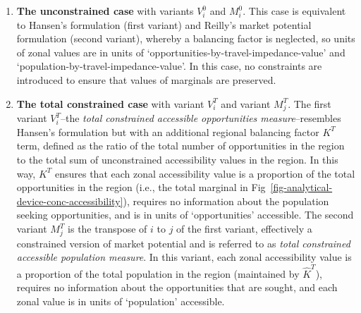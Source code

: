 \documentclass[
  10pt,
  letterpaper,
]{article}
\begin{document}
\begin{enumerate}
\def\labelenumi{\arabic{enumi}.}
\item
  \textbf{The unconstrained case} with variants \(V_i^0\) and \(M_i^0\).
  This case is equivalent to Hansen's \citep{hansen1959} formulation
  (first variant) and Reilly's \citep{reilly1929methods} market
  potential formulation (second variant), whereby a balancing factor is
  neglected, so units of zonal values are in units of
  `opportunities-by-travel-impedance-value' and
  `population-by-travel-impedance-value'. In this case, no constraints
  are introduced to ensure that values of marginals are preserved.
\item
  \textbf{The total constrained case} with variant \(V_i^T\) and variant
  \(M_j^T\). The first variant \(V_i^T\)--the \emph{total constrained
  accessible opportunities measure}--resembles Hansen's
  \citep{hansen1959} formulation but with an additional regional
  balancing factor \(K^T\) term, defined as the ratio of the total
  number of opportunities in the region to the total sum of
  unconstrained accessibility values in the region. In this way, \(K^T\)
  ensures that each zonal accessibility value is a proportion of the
  total opportunities in the region (i.e., the total marginal in
  Fig~\ref{fig-analytical-device-conc-accessibility}), requires no
  information about the population seeking opportunities, and is in
  units of `opportunities' accessible. The second variant \(M_j^T\) is
  the transpose of \(i\) to \(j\) of the first variant, effectively a
  constrained version of market potential and is referred to as
  \emph{total constrained accessible population measure}. In this
  variant, each zonal accessibility value is a proportion of the total
  population in the region (maintained by \(\hat K^T\)), requires no
  information about the opportunities that are sought, and each zonal
  value is in units of `population' accessible.
\end{enumerate}
\end{document}

